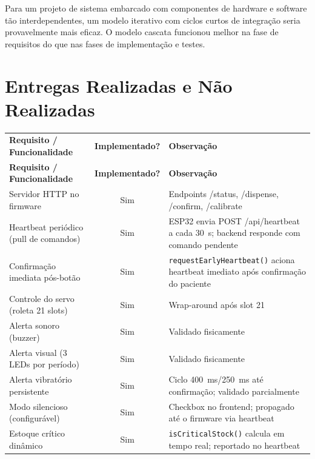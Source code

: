 \documentclass[12pt,a4paper]{article}
\newcommand{\lightrule}{\arrayrulecolor{gray!35}\midrule\arrayrulecolor{black}}
\begin{document}
Para um projeto de sistema embarcado com componentes de hardware e software tão interdependentes, um modelo iterativo com ciclos curtos de integração seria provavelmente mais eficaz. O modelo cascata funcionou melhor na fase de requisitos do que nas fases de implementação e testes.

\newpage

\section{Entregas Realizadas e Não Realizadas}

\begin{longtable}{p{6.5cm}cp{5cm}}
    \toprule
    \textbf{Requisito / Funcionalidade} & \textbf{Implementado?} & \textbf{Observação} \\
    \lightrule
    \endfirsthead
    \lightrule
    \textbf{Requisito / Funcionalidade} & \textbf{Implementado?} & \textbf{Observação} \\
    \lightrule
    \endhead
    Servidor HTTP no firmware           & Sim  & Endpoints /status, /dispense, /confirm, /calibrate \\
    \lightrule
    Heartbeat periódico (pull de comandos) & Sim & ESP32 envia POST /api/heartbeat a cada 30~s; backend responde com comando pendente \\
    \lightrule
    Confirmação imediata pós-botão      & Sim  & \texttt{requestEarlyHeartbeat()} aciona heartbeat imediato após confirmação do paciente \\
    \lightrule
    Controle do servo (roleta 21 slots) & Sim  & Wrap-around após slot 21 \\
    \lightrule
    Alerta sonoro (buzzer)              & Sim  & Validado fisicamente \\
    \lightrule
    Alerta visual (3 LEDs por período)  & Sim  & Validado fisicamente \\
    \lightrule
    Alerta vibratório persistente       & Sim  & Ciclo 400~ms/250~ms até confirmação; validado parcialmente \\
    \lightrule
    Modo silencioso (configurável)      & Sim  & Checkbox no frontend; propagado até o firmware via heartbeat \\
    \lightrule
    Estoque crítico dinâmico            & Sim  & \texttt{isCriticalStock()} calcula em tempo real; reportado no heartbeat \\

\end{longtable}
\end{document}
